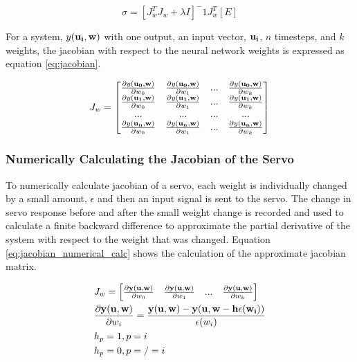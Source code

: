 \documentclass[letterpaper,12pt]{article}
\newcommand{\di}{\partial}
\begin{document}
\begin{equation}
	\label{eq:levenberg_solved}
	\sigma = [J_w^T J_w + \lambda I]^-1 J_w^T [E]
\end{equation}

For a system, $y(\bf{u_i}, w)$ with one output, an input vector, $\bf{u_i}$, $n$ timesteps, and $k$ weights, the jacobian with respect to the neural network weights is expressed as equation \ref{eq:jacobian}.

\begin{equation}
	\label{eq:jacobian}
	J_w = \begin{bmatrix}
		\frac{\di y(\bf{u_0}, \bf{w})}{\di w_0} & \frac{\di y(\bf{u_0}, \bf{w})}{\di w_1} & ... & \frac{\di y(\bf{u_0}, \bf{w})}{\di w_k} \\
		\frac{\di y(\bf{u_1}, \bf{w})}{\di w_0} & \frac{\di y(\bf{u_1}, \bf{w})}{\di w_1} & ... & \frac{\di y(\bf{u_1}, \bf{w})}{\di w_k} \\
		... & ... & ... & ... \\
		\frac{\di y(\bf{u_n}, \bf{w})}{\di w_0} & \frac{\di y(\bf{u_n}, \bf{w})}{\di w_1} & ... & \frac{\di y(\bf{u_n}, \bf{w})}{\di w_k}


	\end{bmatrix}
\end{equation}

\subsubsection{Numerically Calculating the Jacobian of the Servo}\label{sec:numerical_jacobian}
To numerically calculate jacobian of a servo, each weight is individually changed by a small amount, $\epsilon$ and then an input signal is sent to the servo. The change in servo response before and after the small weight change is recorded and used to calculate a finite backward difference to approximate the partial derivative of the system with respect to the weight that was changed. Equation \ref{eq:jacobian_numerical_calc} shows the calculation of the approximate jacobian matrix.

\begin{equation}
\begin{split}
	\label{eq:jacobian_numerical_calc}
	& J_w = \begin{bmatrix}
		\frac{\di \bf{y}(\bf{u}, \bf{w})}{\di w_0} & \frac{\di \bf{y}(\bf{u}, \bf{w})}{\di w_1} & ... & \frac{\di \bf{y}(\bf{u}, \bf{w})}{\di w_k}
	\end{bmatrix} \\
	& \frac{\di \bf{y}(\bf{u}, \bf{w})}{\di w_i} = \frac{\bf{y}(\bf{u}, \bf{w}) - \bf{y}(\bf{u}, \bf{w} - \bf{h}\epsilon(w_i))}{\epsilon(w_i)} \\
	& h_p = 1, p = i \\
	& h_p = 0, p =/= i
\end{split}
\end{equation}
\end{document}
